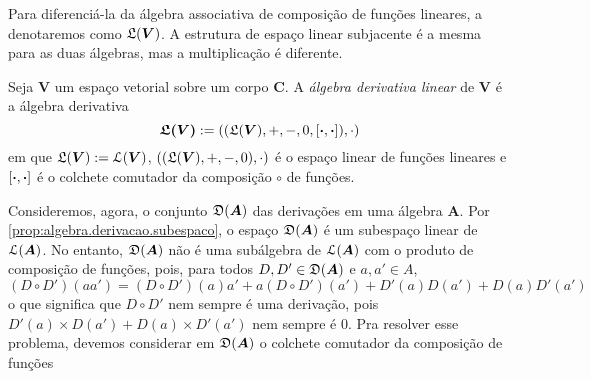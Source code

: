 Para diferenciá-la da álgebra associativa de composição de funções lineares, a denotaremos como $\mathfrak{L}(\bm V)$. A estrutura de espaço linear subjacente é a mesma para as duas álgebras, mas a multiplicação é diferente.

\begin{definition}
Seja $\bm V$ um espaço vetorial sobre um corpo $\bm C$. A \emph{álgebra derivativa linear} de $\bm V$ é a álgebra derivativa
	\begin{equation*}
	\bm{\mathfrak{L}(\bm V)} := ((\mathfrak{L}(\bm V),+,-,0,\left[{\bm{\cdot}},{\bm{\cdot}}\right]),\cdot)
	\end{equation*}
em que $\mathfrak{L}(\bm V) := \mathcal{L}(\bm V)$, $((\mathfrak{L}(\bm V),+,-,0),\cdot)$ é o espaço linear de funções lineares e $\left[{\bm{\cdot}},{\bm{\cdot}}\right]$ é o colchete comutador da composição $\circ$ de funções.
\end{definition}

Consideremos, agora, o conjunto $\mathfrak{D}(\bm A)$ das derivações em uma álgebra $\bm A$. Por \ref{prop:algebra.derivacao.subespaco}, o espaço $\mathfrak{D}(\bm A)$ é um subespaço linear de $\mathcal{L}(\bm A)$. No entanto, $\mathfrak{D}(\bm A)$ não é uma subálgebra de $\mathcal{L}(\bm A)$ com o produto de composição de funções, pois, para todos $D,D' \in \mathfrak{D}(\bm A)$ e $a,a' \in A$,
	\begin{equation*}
	(D \circ D')(aa') = (D \circ D')(a)a' + a (D \circ D')(a') + D'(a)D(a') + D(a)D'(a')
	\end{equation*}
o que significa que $D \circ D'$ nem sempre é uma derivação, pois $D'(a) \times D(a') + D(a) \times D'(a')$ nem sempre é $0$. Pra resolver esse problema, devemos considerar em $\mathfrak{D}(\bm A)$ o colchete comutador da composição de funções%

